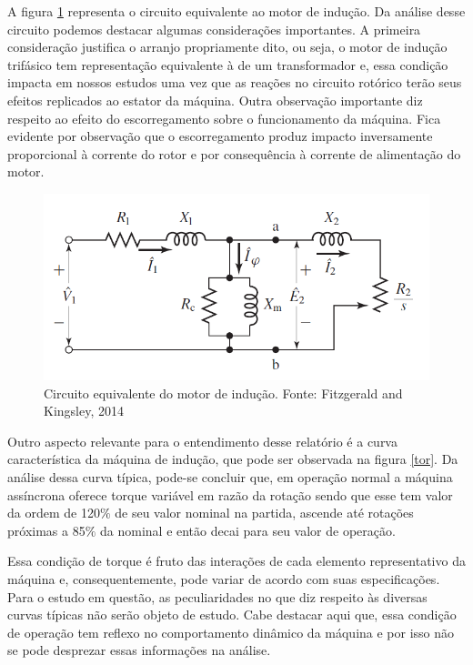 \documentclass[a4paper, 12pt,oneside, english, brazil]{abntex2}
\begin{document}
A figura \ref{rot} representa o circuito equivalente ao motor de indução. Da análise desse circuito podemos destacar algumas considerações importantes. A primeira consideração justifica o arranjo propriamente dito, ou seja, o motor de indução trifásico tem representação equivalente à de um transformador e, essa condição impacta em nossos estudos uma vez que as reações no circuito rotórico terão seus efeitos replicados ao estator da máquina. Outra observação importante diz respeito ao efeito do escorregamento sobre o funcionamento da máquina. Fica evidente por observação que o escorregamento produz impacto inversamente proporcional à corrente do rotor e por consequência à corrente de alimentação do motor.

\begin{figure}[H]
    \centering
    \includegraphics[scale=0.42]{rot.png}
    \caption{Circuito equivalente do motor de indução. Fonte: Fitzgerald and Kingsley, 2014}
    \label{rot}
\end{figure}

Outro aspecto relevante para o entendimento desse relatório é a curva característica da máquina de indução, que pode ser observada na figura \ref{tor}. Da análise dessa curva típica, pode-se concluir que, em operação normal a máquina assíncrona oferece torque variável em razão da rotação sendo que esse tem valor da ordem de 120$\%$ de seu valor nominal na partida, ascende até rotações próximas a 85$\%$ da nominal e então decai para seu valor de operação. 

Essa condição de torque é fruto das interações de cada elemento representativo da máquina e, consequentemente, pode variar de acordo com suas especificações. Para o estudo em questão, as peculiaridades no que diz respeito às diversas curvas típicas não serão objeto de estudo. Cabe destacar aqui que, essa condição de operação tem reflexo no comportamento dinâmico da máquina e por isso não se pode desprezar essas informações na análise.
\end{document}
